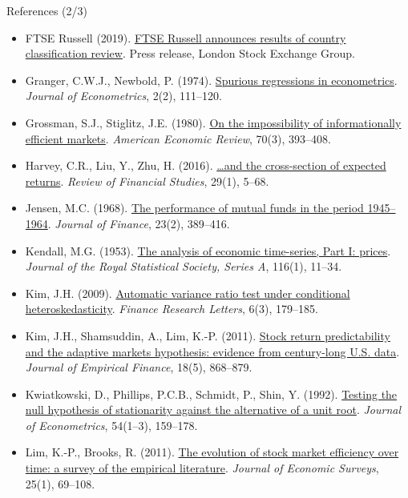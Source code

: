 \begin{frame}{References (2/3)}
\itemsize{\tiny}
\begin{itemize}
    \item FTSE Russell (2019). \href{https://www.lseg.com/en/media-centre/press-releases/ftse-russell/2019/ftse-russell-announces-results-country-classification-review-equities-and-fixed-income}{FTSE Russell announces results of country classification review}. Press release, London Stock Exchange Group.
    \item Granger, C.W.J., Newbold, P. (1974). \href{https://doi.org/10.1016/0304-4076(74)90034-7}{Spurious regressions in econometrics}. \textit{Journal of Econometrics}, 2(2), 111--120.
    \item Grossman, S.J., Stiglitz, J.E. (1980). \href{https://ideas.repec.org/a/aea/aecrev/v70y1980i3p393-408.html}{On the impossibility of informationally efficient markets}. \textit{American Economic Review}, 70(3), 393--408.
    \item Harvey, C.R., Liu, Y., Zhu, H. (2016). \href{https://doi.org/10.1093/rfs/hhv059}{\ldots and the cross-section of expected returns}. \textit{Review of Financial Studies}, 29(1), 5--68.
    \item Jensen, M.C. (1968). \href{https://doi.org/10.1111/j.1540-6261.1968.tb00815.x}{The performance of mutual funds in the period 1945--1964}. \textit{Journal of Finance}, 23(2), 389--416.
    \item Kendall, M.G. (1953). \href{https://doi.org/10.2307/2980947}{The analysis of economic time-series, Part I: prices}. \textit{Journal of the Royal Statistical Society, Series A}, 116(1), 11--34.
    \item Kim, J.H. (2009). \href{https://doi.org/10.1016/j.frl.2009.04.003}{Automatic variance ratio test under conditional heteroskedasticity}. \textit{Finance Research Letters}, 6(3), 179--185.
    \item Kim, J.H., Shamsuddin, A., Lim, K.-P. (2011). \href{https://doi.org/10.1016/j.jempfin.2011.08.002}{Stock return predictability and the adaptive markets hypothesis: evidence from century-long U.S. data}. \textit{Journal of Empirical Finance}, 18(5), 868--879.
    \item Kwiatkowski, D., Phillips, P.C.B., Schmidt, P., Shin, Y. (1992). \href{https://doi.org/10.1016/0304-4076(92)90104-Y}{Testing the null hypothesis of stationarity against the alternative of a unit root}. \textit{Journal of Econometrics}, 54(1--3), 159--178.
    \item Lim, K.-P., Brooks, R. (2011). \href{https://doi.org/10.1111/j.1467-6419.2009.00611.x}{The evolution of stock market efficiency over time: a survey of the empirical literature}. \textit{Journal of Economic Surveys}, 25(1), 69--108.

\end{itemize}
\end{frame}
